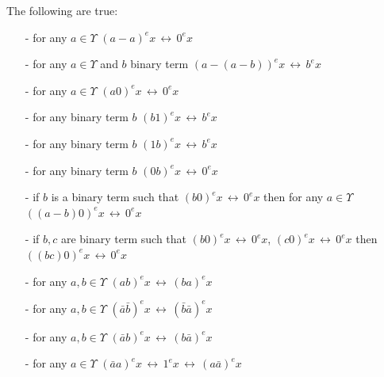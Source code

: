 \documentclass{article}
\begin{document}
\begin{proposition}
The following are true: 
\begin{enumerate}
\item[-] for any $a \in \Upsilon$  $\displaystyle (a - a)^{e} x \, \longleftrightarrow \, 0^{e} x$
\item[-] for any $a \in \Upsilon$ and $b$ binary term $\displaystyle \left(a - \left(a - b\right)\right)^{e} x \, \longleftrightarrow \, b^{e} x$
\item[-] for any $a \in \Upsilon$  $\displaystyle \left(a 0 \right)^{e} x \, \longleftrightarrow \, 0^{e} x$
\item[-] for any binary term $b$  $\displaystyle \left(b 1 \right)^{e} x \, \longleftrightarrow \, b^{e} x$
\item[-] for any binary term $b$  $\displaystyle \left(1 b \right)^{e} x \, \longleftrightarrow \, b^{e} x$
\item[-] for any binary term $b$  $\displaystyle \left(0 b \right)^{e} x \, \longleftrightarrow \, 0^{e} x$
\item[-] if $b$ is a binary term such that $\displaystyle  \left(b 0 \right)^{e} x \, \longleftrightarrow \, 0^{e} x$ then for any $a \in \Upsilon$ $\displaystyle \left(\left(a-b\right) 0 \right)^{e} x \, \longleftrightarrow \, 0^{e} x$
\item[-] if $b, c$ are binary term such that $\displaystyle  \left(b 0 \right)^{e} x \, \longleftrightarrow \, 0^{e} x$,  $\displaystyle  \left(c 0 \right)^{e} x \, \longleftrightarrow \, 0^{e} x$ then $\displaystyle  \left(\left(b c\right) 0 \right)^{e} x \, \longleftrightarrow \, 0^{e} x$ 
\item[-] for any $a,b \in \Upsilon$ $\displaystyle \left(a b \right)^{e} x \, \longleftrightarrow \, \left(b a  \right)^{e} x$
\item[-] for any $a,b \in \Upsilon$ $\displaystyle \left(\bar{a} \bar{b} \right)^{e} x \, \longleftrightarrow \, \left(\bar{b} \bar{a}  \right)^{e} x$
\item[-] for any $a,b \in \Upsilon$ $\displaystyle \left(\bar{a} b \right)^{e} x \, \longleftrightarrow \, \left(b \bar{a}  \right)^{e} x$
\item[-] for any $a \in \Upsilon$ $\displaystyle \left(\bar{a} a \right)^{e} x \, \longleftrightarrow \, 1^{e} x  \, \longleftrightarrow \, \left(a \bar{a}  \right)^{e} x$
\end{enumerate}

\end{proposition}
\end{document}
